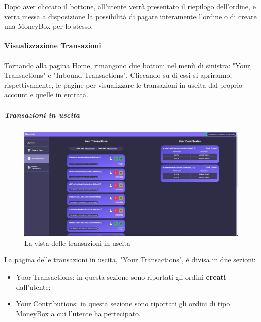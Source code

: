             Dopo aver cliccato il bottone, all'utente verrà presentato il riepilogo dell'ordine, e verra messa a disposizione la possibilità
            di pagare interamente l'ordine o di creare una MoneyBox per lo stesso.


            \paragraph{Visualizzazione Transazioni}

            Tornando alla pagina Home, rimangono due bottoni nel menù di sinistra: "Your Transactions" e "Inbound Transactions".
            Cliccando su di essi si apriranno, rispettivamente, le pagine per visualizzare le transazioni in uscita dal proprio account e quelle in entrata.


                \subparagraph{Transazioni in uscita}

                \begin{figure}[H]
                    \centering
                    \includegraphics[scale=0.4]{immagini/Transaction/transactionview.jpg}
                    \caption{La vista delle transazioni in uscita}
                \end{figure}

                La pagina delle transazioni in uscita, "Your Transactions", è divisa in due sezioni:
                \begin{itemize}
                    \item Yuor Transactions: in questa sezione sono riportati gli ordini \textbf{creati} dall'utente;
                    \item Your Contributions: in questa sezione sono riportati gli ordini di tipo MoneyBox a cui l'utente ha pertecipato.
                \end{itemize}

